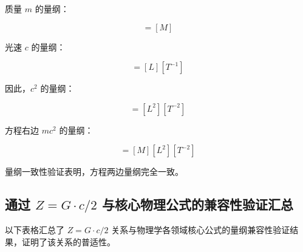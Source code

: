 \documentclass[12pt,a4paper]{article}
\begin{document}
质量 $m$ 的量纲：

\begin{equation}
[m] = [M]

\end{equation}

光速 $c$ 的量纲：

\begin{equation}
[c] = [L][T^{-1}]

\end{equation}

因此，$c^2$ 的量纲：

\begin{equation}
[c^2] = [L^2][T^{-2}]

\end{equation}

方程右边 $m c^2$ 的量纲：

\begin{equation}
[m c^2] = [M] [L^2][T^{-2}]

\end{equation}

量纲一致性验证表明，方程两边量纲完全一致。

\subsection{通过 $Z = G \cdot c / 2$ 与核心物理公式的兼容性验证汇总}
\label{subsection:core_physical_formula_compatibility}

以下表格汇总了 $Z = G \cdot c / 2$ 关系与物理学各领域核心公式的量纲兼容性验证结果，证明了该关系的普适性。
\end{document}
